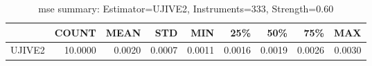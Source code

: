 \begin{table}[ht]
\centering
\caption{mse summary: Estimator=UJIVE2, Instruments=333, Strength=0.60}
\begin{tabular}{lrrrrrrrr}
\toprule
 & COUNT & MEAN & STD & MIN & 25\% & 50\% & 75\% & MAX \\
\midrule
UJIVE2 & 10.0000 & 0.0020 & 0.0007 & 0.0011 & 0.0016 & 0.0019 & 0.0026 & 0.0030 \\
\bottomrule
\end{tabular}
\end{table}
